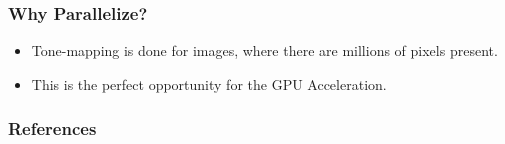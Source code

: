 \documentclass{beamer}
\begin{document}
\begin{frame}
    \frametitle{Why Parallelize?}
    \begin{itemize}
        \item Tone-mapping is done for images, where there are millions of pixels present.
        \item This is the perfect opportunity for the GPU Acceleration.
    \end{itemize}
    

\end{frame}

\begin{frame}
    \frametitle{References}
    \begin{thebibliography}{00}
    \end{thebibliography}    

\end{frame}
\end{document}
